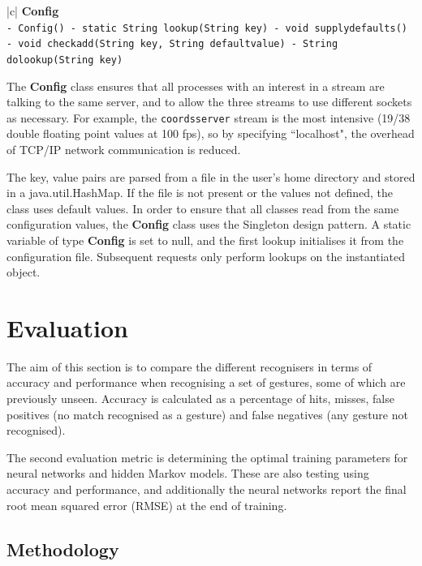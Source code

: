 \documentclass[12pt,a4,notitlepage]{report}
\renewcommand{\_}{\texttt{\symbol{95}}}
\newcommand{\<}{\texttt{\symbol{60}}}
\renewcommand{\>}{\texttt{\symbol{62}}}
\newcommand{\class}[1]{\textbf{#1}}
\newcommand{\scopendpoint}[1]{\texttt{#1}}
\newcommand{\variable}[1]{\texttt{#1}}
\begin{document}
\begin{tabular}{|c|} \hline 
\class{Config} \\ \hline
{}
{\variable{- Config() \newline
- static String lookup(String key) \newline
- void supply\_defaults() \newline
- void check\_add(String key, String defaultvalue) \newline
- String do\_lookup(String key)
} } \\ \hline
\end{tabular}

The \class{Config} class ensures that all processes with an interest in a stream are talking to the same server, and to allow the three streams to use different sockets as necessary. For example, the \scopendpoint{coordsserver} stream is the most intensive (19/38 double floating point values at 100 fps), so by specifying ``localhost", the overhead of TCP/IP network communication is reduced.

The \<key, value\> pairs are parsed from a file in the user's home directory and stored in a java.util.HashMap. If the file is not present or the values not defined, the class uses default values. In order to ensure that all classes read from the same configuration values, the \class{Config} class uses the Singleton design pattern. A static variable of type \class{Config} is set to null, and the first lookup initialises it from the configuration file. Subsequent requests only perform lookups on the instantiated object.

\chapter{Evaluation}

The aim of this section is to compare the different recognisers in terms of accuracy and performance when recognising a set of gestures, some of which are previously unseen. Accuracy is calculated as a percentage of hits, misses, false positives (no match recognised as a gesture) and false negatives (any gesture not recognised).

The second evaluation metric is determining the optimal training parameters for neural networks and hidden Markov models. These are also testing using accuracy and performance, and additionally the neural networks report the final root mean squared error (RMSE) at the end of training.

\section{Methodology}
\end{document}
